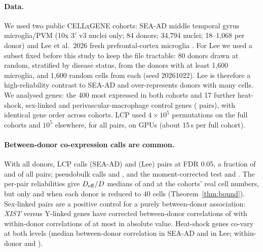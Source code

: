 \paragraph{Data.} We used two public CELLxGENE cohorts: SEA-AD middle temporal gyrus microglia/PVM (10x 3$'$ v3 nuclei only; 84 donors; 34{,}794 nuclei; 18--1{,}068 per donor) \citep{Gabitto2024SEAAD} and Lee et al.\ 2026 fresh prefrontal-cortex microglia \citep{Lee2026}. For Lee we used a subset fixed before this study to keep the file tractable: 80 donors drawn at random, stratified by disease status, from the donors with at least 1{,}600 microglia, and 1{,}600 random cells from each (seed 20261022). Lee is therefore a high-reliability contrast to SEA-AD and over-represents donors with many cells. We analysed \RealG{} genes: the 400 most expressed in both cohorts and 17 further heat-shock, sex-linked and perivascular-macrophage control genes (\RealPairs{} pairs), with identical gene order across cohorts. LCP used $4\times10^5$ permutations on the full cohorts and $10^5$ elsewhere, for all pairs, on GPUs (about 15\,s per full cohort).

\paragraph{Between-donor co-expression calls are common.} With all donors, LCP calls \SEAADfullLCP{} (SEA-AD) and \LEEfullLCP{} (Lee) pairs at FDR 0.05, a fraction of \SEAADfullLCPfrac{} and \LEEfullLCPfrac{} of all pairs; pseudobulk calls \SEAADfullPB{} and \LEEfullPB{}, and the moment-corrected test \SEAADfullMC{} and \LEEfullMC{}. The per-pair reliabilities give $D_{\mathrm{eff}}/D$ medians of \DeffSEAADfull{} and \DeffLEEfull{} at the cohorts' real cell numbers, but only \DeffSEAADcap{} and \DeffLEEcap{} when each donor is reduced to 40 cells (Theorem~\ref{thm:bound}). Sex-linked pairs are a positive control for a purely between-donor association: \emph{XIST} versus Y-linked genes have corrected between-donor correlations of \sexRhoRange{} with within-donor correlations of at most \sexWithinMax{} in absolute value. Heat-shock genes co-vary at both levels (median between-donor correlation \hsRhoSEAAD{} in SEA-AD and \hsRhoLEE{} in Lee; within-donor \hsWSEAAD{} and \hsWLEE{}).

